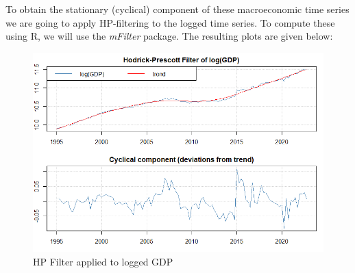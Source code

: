 \documentclass[a4paper,11pt]{article}
\begin{document}
To obtain the stationary (cyclical) component of these macroeconomic time series we are going to apply HP-filtering to the logged time series. To compute these using R, we will use the \textit{mFilter} package. The resulting plots are given below:
\begin{figure}[H]
    \centering
    \includegraphics[scale=0.65]{HPFilter_GDP.png}
    \caption{HP Filter applied to logged GDP}
    \label{fig:my_label}
\end{figure}
\end{document}
